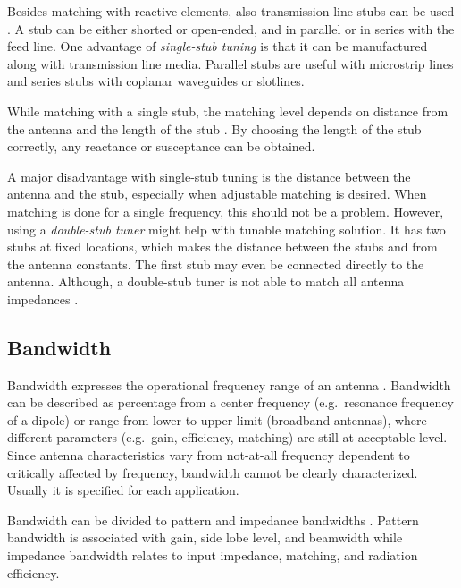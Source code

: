 Besides matching with reactive elements, also transmission line stubs can be used \cite{pozar}. A stub can be either shorted or open-ended, and in parallel or in series with the feed line. One advantage of \textit{single-stub tuning} is that it can be manufactured along with transmission line media. Parallel stubs are useful with microstrip lines and series stubs with coplanar waveguides or slotlines.

While matching with a single stub, the matching level depends on distance from the antenna and the length of the stub \cite{pozar}. By choosing the length of the stub correctly, any reactance or susceptance can be obtained.

A major disadvantage with single-stub tuning is the distance between the antenna and the stub, especially when adjustable matching is desired. When matching is done for a single frequency, this should not be a problem. However, using a \textit{double-stub tuner} might help with tunable matching solution. It has two stubs at fixed locations, which makes the distance between the stubs and from the antenna constants. The first stub may even be connected directly to the antenna. Although, a double-stub tuner is not able to match all antenna impedances \cite{pozar}.


\subsection{Bandwidth}
\label{sec:bandwidth}
Bandwidth expresses the operational frequency range of an antenna \cite{balanis}. Bandwidth can be described as percentage from a center frequency (e.g.\ resonance frequency of a dipole) or range from lower to upper limit (broadband antennas), where different parameters (e.g.\ gain, efficiency, matching) are still at acceptable level. Since antenna characteristics vary from not-at-all frequency dependent to critically affected by frequency, bandwidth cannot be clearly characterized. Usually it is specified for each application.

Bandwidth can be divided to pattern and impedance bandwidths \cite{balanis}. Pattern bandwidth is associated with gain, side lobe level, and beamwidth while impedance bandwidth relates to input impedance, matching, and radiation efficiency.

